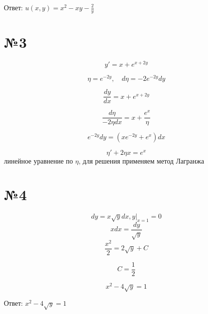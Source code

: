 \documentclass{article}
\begin{document}
Ответ: $ u(x,y)=x^2 - xy - \frac{2}{y}$

\section*{№3}

\begin{equation*}
    y' = x + e^{x + 2y}
\end{equation*}

\begin{equation*}
   \eta = e^{-2y}, \quad    d\eta = -2e^{-2y}dy
\end{equation*}

\begin{equation*}
    \frac{dy}{dx} = x + e^{x + 2y}
\end{equation*}

\begin{equation*}
    \frac{d\eta}{-2\eta dx} = x + \frac{e^{x}}{\eta}
\end{equation*}

\begin{equation*}
    e^{-2y}dy = (xe^{-2y} + e^x)dx
\end{equation*}

\begin{equation*}
    \eta '+2\eta x=e^x
\end{equation*}
линейное уравнение по $\eta$, для решения применяем метод Лагранжа


\section*{№4}

\begin{equation*}
    dy = x\sqrt{y} dx,y|_{x=1} = 0
\end{equation*}
\begin{equation*}
    xdx = \frac{dy}{\sqrt{y}}
\end{equation*}
\begin{equation*}
    \frac{x^2}{2} = 2\sqrt{y} + C
\end{equation*}

\begin{equation*}
    C = \frac{1}{2}
\end{equation*}

\begin{equation*}
    x^2 - 4\sqrt{y} = 1
\end{equation*}

Ответ: $x^2 - 4\sqrt{y} = 1$
\end{document}
